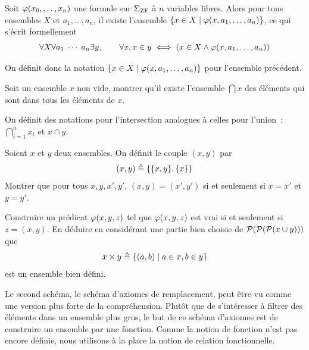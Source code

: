 \begin{axiom}\label{ax.ZF.compre}
  Soit $\varphi(x_0,\ldots,x_n)$ une formule sur $\Sigma_{\operatorname{ZF}}$
  à $n$ variables libres. Alors pour tous ensembles $X$ et $a_1,\ldots,a_n$, il
  existe l'ensemble $\left\{ x\in X \;\middle\vert\; \varphi(x,a_1,\ldots,a_n) \right\}$, ce qui s'écrit
  formellement
  \[\forall X\forall a_1\;\cdots\;a_n\exists y,\qquad
  \forall x, x \in y \iff (x\in X\land \varphi(x,a_1,\ldots,a_n))\]
\end{axiom}

\begin{notation}
  On définit donc la notation $\left\{ x\in X \;\middle\vert\; \varphi(x,a_1,\ldots,a_n) \right\}$ pour
  l'ensemble précédent.
\end{notation}

\begin{exercise}
  Soit un ensemble $x$ non vide, montrer qu'il existe l'ensemble $\bigcap x$ des
  éléments qui sont dans tous les éléments de $x$.
\end{exercise}

\begin{notation}
  On définit des notations pour l'intersection analogues à celles pour l'union~:
  $\displaystyle\bigcap_{i = 1}^n x_i$ et $x \cap y$.
\end{notation}

\begin{exercise}\label{exo.ZF.prod}
  Soient $x$ et $y$ deux ensembles. On définit le couple $(x,y)$ par
  \[(x,y) \triangleq \{\{x,y\},\{x\}\}\]
  Montrer que pour tous $x,y,x',y'$, $(x,y) = (x',y')$ si et seulement si
  $x=x'$ et $y=y'$.

  Construire un prédicat $\varphi(x,y,z)$ tel que $\varphi(x,y,z)$ est vrai
  si et seulement si $z = (x,y)$. En déduire en considérant une partie bien
  choisie de $\mathcal{P} (\mathcal{P} (\mathcal{P}(x\cup y)))$ que
  \[x\times y \triangleq \left\{ (a,b) \;\middle\vert\; a \in x, b \in y \right\}\]
  est un ensemble bien défini.
\end{exercise}

Le second schéma, le schéma d'axiomes de remplacement, peut être vu comme une
version plus forte de la compréhension. Plutôt que de s'intéresser à filtrer des
éléments dans un ensemble plus gros, le but de ce schéma d'axiomes est de
construire un ensemble par une fonction. Comme la notion de fonction n'est pas
encore définie, nous utilisons à la place la notion de relation fonctionnelle.

